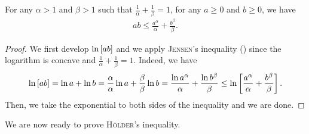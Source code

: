 \begin{lemma}
For any $\alpha>1$ and $\beta>1$ such that $\frac{1}{\alpha}+\frac{1}{\beta}=1$, for any $a\ge0$ and $b\ge 0$, we have
\begin{align*}
    ab \le \frac{a^{\alpha}}{\alpha} + \frac{b^{\beta}}{\beta}.
\end{align*}
\label{ap:tools:lemma:young}
\end{lemma}
\begin{noaddcontents}\begin{proof}
We first develop $\ln\left[ ab\right]$ and we apply \textsc{Jensen}'s inequality () since the logarithm is concave and $\frac{1}{\alpha}+\frac{1}{\beta}=1$.
Indeed, we have
\begin{align*}
    \ln\left[ ab\right] = \ln a + \ln b = \frac{\alpha}{\alpha}\ln a + \frac{\beta}{\beta}\ln b = \frac{\ln a^{\alpha}}{\alpha} + \frac{\ln b^{\beta}}{\beta} \le \ln\left[ \frac{a^{\alpha}}{\alpha} + \frac{b^{\beta}}{\beta} \right].
\end{align*}
Then, we take the exponential to both sides of the inequality and we are done.
\end{proof}\end{noaddcontents}

We are now ready to prove \textsc{Hölder}'s inequality.

